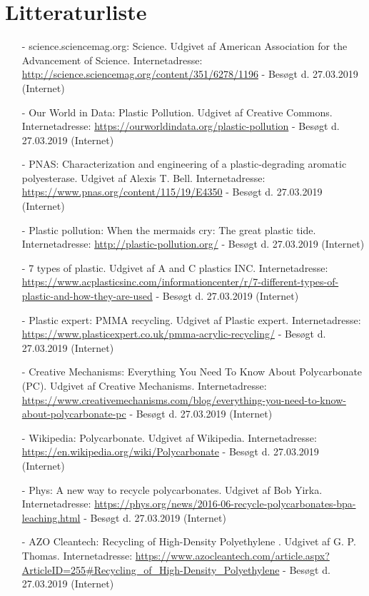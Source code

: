 \documentclass[12pt]{article}
\begin{document}
\section*{Litteraturliste}

\begin{enumerate}

        \item[-] science.sciencemag.org: Science. Udgivet af American Association for the Advancement of Science. Internetadresse: \url{http://science.sciencemag.org/content/351/6278/1196} - Besøgt d. 27.03.2019 (Internet)
        \item[-] Our World in Data: Plastic Pollution. Udgivet af Creative Commons. Internetadresse: \url{https://ourworldindata.org/plastic-pollution} - Besøgt d. 27.03.2019 (Internet)
        \item[-] PNAS: Characterization and engineering of a plastic-degrading aromatic polyesterase. Udgivet af Alexis T. Bell. Internetadresse: \url{https://www.pnas.org/content/115/19/E4350} - Besøgt d. 27.03.2019 (Internet)
        \item[-] Plastic pollution: When the mermaids cry: The great plastic tide. Internetadresse: \url{http://plastic-pollution.org/} - Besøgt d. 27.03.2019 (Internet)
        \item[-] 7 types of plastic. Udgivet af A and C plastics INC.
                Internetadresse: \url{https://www.acplasticsinc.com/informationcenter/r/7-different-types-of-plastic-and-how-they-are-used} - Besøgt d. 27.03.2019 (Internet)
        \item[-] Plastic expert: PMMA recycling. Udgivet af Plastic expert. Internetadresse: \url{https://www.plasticexpert.co.uk/pmma-acrylic-recycling/} - Besøgt d. 27.03.2019 (Internet)
        \item[-] Creative Mechanisms: Everything You Need To Know About Polycarbonate (PC). Udgivet af Creative Mechanisms. Internetadresse: \url{https://www.creativemechanisms.com/blog/everything-you-need-to-know-about-polycarbonate-pc} - Besøgt d. 27.03.2019 (Internet)
        \item[-] Wikipedia: Polycarbonate. Udgivet af Wikipedia. Internetadresse: \url{https://en.wikipedia.org/wiki/Polycarbonate} - Besøgt d. 27.03.2019 (Internet)
        \item[-] Phys: A new way to recycle polycarbonates. Udgivet af Bob Yirka. Internetadresse: \url{https://phys.org/news/2016-06-recycle-polycarbonates-bpa-leaching.html} - Besøgt d. 27.03.2019 (Internet)
        \item[-] AZO Cleantech: Recycling of High-Density Polyethylene . Udgivet af G. P. Thomas. Internetadresse: \url{https://www.azocleantech.com/article.aspx?ArticleID=255#Recycling_of_High-Density_Polyethylene} - Besøgt d. 27.03.2019 (Internet)

\end{enumerate}
\end{document}
